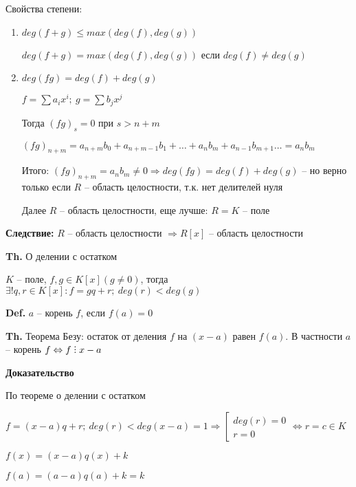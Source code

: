 \documentclass[14pt, letter paper]{article}
\def\divby{%
  \mathrel{\text{\vbox{\baselineskip.65ex\lineskiplimit0pt\hbox{.}\hbox{.}\hbox{.}}}}%
}
\begin{document}
\vspace{5mm}

Свойства степени:

\begin{enumerate}
    \item $deg(f + g) \leq max(deg(f), deg(g))$

    $deg(f + g) = max(deg(f), deg(g))$ если $deg(f) \neq deg(g)$

    \item $deg(fg) = deg(f) + deg(g)$

    $f = \sum a_ix^i;\ g = \sum b_jx^j$

    Тогда $(fg)_s = 0$ при $s > n + m$

    $(fg)_{n+m} = a_{n+m}b_0 + a_{n+m-1}b_1 + \ldots + a_nb_m + a_{n-1}b_{m+1} \ldots = a_nb_m$

    Итого: $(fg)_{n+m} = a_nb_m \neq 0 \Rightarrow deg(fg) = deg(f) + deg(g)$ -- но верно только если $R$ -- область целостности, т.к. нет делителей нуля

    Далее $R$ -- область целостности, еще лучше: $R = K$ -- поле
\end{enumerate}

\textbf{Следствие:} $R$ -- область целостности $\Rightarrow R[x]$ -- область целостности 

\vspace{5mm}

\textbf{Th.} О делении с остатком

$K$ -- поле, $f, g \in K[x] (g \neq 0)$, тогда $\exists! q, r \in K[x] : f = gq + r;\ deg(r) < deg(g)$

\textbf{Def.} $a$ -- корень $f$, если $f(a) = 0$

\textbf{Th.} Теорема Безу: остаток от деления $f$ на $(x - a)$ равен $f(a)$. В частности $a$ -- корень $f \Leftrightarrow f \divby x - a$

\begin{center}
    \textbf{Доказательство}
\end{center}

По теореме о делении с остатком

$f = (x-a)q + r;\ deg(r) < deg(x-a) = 1 \Rightarrow \left[ \begin{gathered}
    deg(r) = 0 \\
    r = 0
\end{gathered} \right. \Leftrightarrow r = c \in K$

$f(x) = (x - a) q(x) + k$

$f(a) = (a - a) q(a) + k = k$
\end{document}
